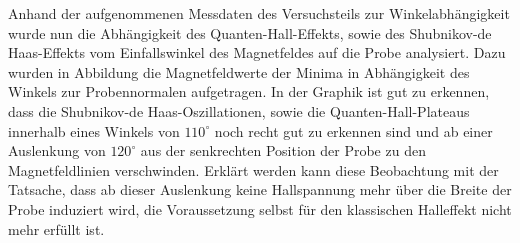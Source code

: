 

Anhand der aufgenommenen Messdaten des Versuchsteils zur Winkelabhängigkeit wurde nun die Abhängigkeit des Quanten-Hall-Effekts, sowie des Shubnikov-de Haas-Effekts vom Einfallswinkel des Magnetfeldes auf die Probe analysiert.
Dazu wurden in Abbildung %
die Magnetfeldwerte der Minima in Abhängigkeit des Winkels zur Probennormalen aufgetragen. 
In der Graphik ist gut zu erkennen, dass die Shubnikov-de Haas-Oszillationen, sowie die Quanten-Hall-Plateaus innerhalb eines Winkels von $110^\circ$
noch recht gut zu erkennen sind und ab einer Auslenkung von $120^\circ$
aus der senkrechten Position der Probe zu den Magnetfeldlinien verschwinden. Erklärt werden kann diese Beobachtung mit der Tatsache, dass ab dieser Auslenkung keine Hallspannung mehr über die Breite der Probe induziert wird, die Voraussetzung selbst für den klassischen Halleffekt nicht mehr erfüllt ist.  %




